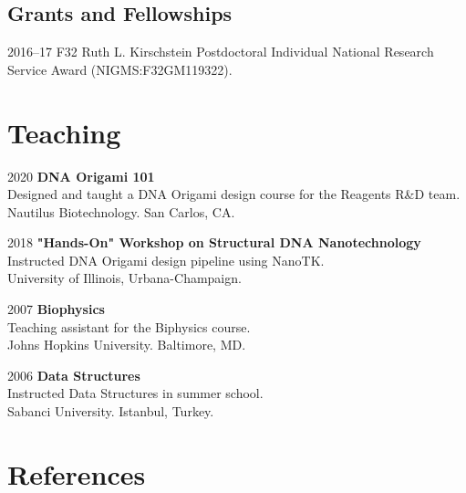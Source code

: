 \documentclass[12pt,letterpaper]{report}
\begin{document}
    \subsection*{Grants and Fellowships}

    \begin{tablist}

        \item[2016--17] \tab{} F32 Ruth L. Kirschstein Postdoctoral Individual National Research Service Award (NIGMS:F32GM119322). 

    \end{tablist}


    \section*{Teaching}


    \begin{tablist}

        \item[2020] \tab{}\textbf{DNA Origami 101}\\
        Designed and taught a DNA Origami design course for the Reagents R\&D team.\\
        Nautilus Biotechnology. San Carlos, CA.

        \item[2018] \tab{}\textbf{"Hands-On" Workshop on Structural DNA Nanotechnology}\\
        Instructed DNA Origami design pipeline using NanoTK. \\ 
        University of Illinois, Urbana-Champaign. 

        \item[2007] \tab{}\textbf{Biophysics} \\ 
        Teaching assistant for the Biphysics course. \\
        Johns Hopkins University. Baltimore, MD.   

        \item[2006] \tab{}\textbf{Data Structures}\\
        Instructed Data Structures in summer school. \\ 
        Sabanci University. Istanbul, Turkey.

    \end{tablist}

    \section*{References}
\end{document}

